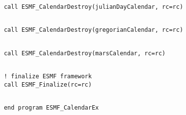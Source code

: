  \begin{verbatim}
      call ESMF_CalendarDestroy(julianDayCalendar, rc=rc)
 
\end{verbatim}
 

 \begin{verbatim}
      call ESMF_CalendarDestroy(gregorianCalendar, rc=rc)
 
\end{verbatim}
 

 \begin{verbatim}
      call ESMF_CalendarDestroy(marsCalendar, rc=rc)
 
\end{verbatim}
 

 \begin{verbatim}
      ! finalize ESMF framework
      call ESMF_Finalize(rc=rc)
 
\end{verbatim}
 

 \begin{verbatim}
      end program ESMF_CalendarEx
 
\end{verbatim}

\setlength{\parskip}{\oldparskip}
\setlength{\parindent}{\oldparindent}
\setlength{\baselineskip}{\oldbaselineskip}
